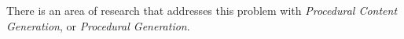 There is an area of research that addresses this problem with \emph{Procedural Content Generation}, or \emph{Procedural Generation}.










